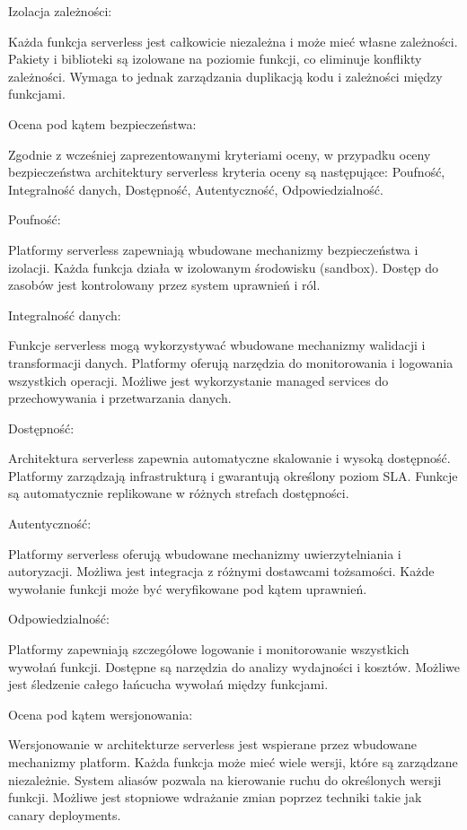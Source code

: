 \documentclass[runningheads,12pt]{llncs}
\begin{document}
Izolacja zależności: 

Każda funkcja serverless jest całkowicie niezależna i może mieć własne zależności. Pakiety i biblioteki są izolowane na poziomie funkcji, co eliminuje konflikty zależności. Wymaga to jednak zarządzania duplikacją kodu i zależności między funkcjami. ~\cite[p. 156]{roberts2018cloud}

Ocena pod kątem bezpieczeństwa:

Zgodnie z wcześniej zaprezentowanymi kryteriami oceny, w przypadku oceny bezpieczeństwa architektury serverless kryteria oceny są następujące: Poufność, Integralność danych, Dostępność, Autentyczność, Odpowiedzialność.

Poufność: 

Platformy serverless zapewniają wbudowane mechanizmy bezpieczeństwa i izolacji. Każda funkcja działa w izolowanym środowisku (sandbox). Dostęp do zasobów jest kontrolowany przez system uprawnień i ról. ~\cite[p. 167]{roberts2018cloud}

Integralność danych: 

Funkcje serverless mogą wykorzystywać wbudowane mechanizmy walidacji i transformacji danych. Platformy oferują narzędzia do monitorowania i logowania wszystkich operacji. Możliwe jest wykorzystanie managed services do przechowywania i przetwarzania danych. ~\cite[p. 189]{roberts2018cloud}

Dostępność: 

Architektura serverless zapewnia automatyczne skalowanie i wysoką dostępność. Platformy zarządzają infrastrukturą i gwarantują określony poziom SLA. Funkcje są automatycznie replikowane w różnych strefach dostępności. ~\cite[p. 198]{roberts2018cloud}

Autentyczność: 

Platformy serverless oferują wbudowane mechanizmy uwierzytelniania i autoryzacji. Możliwa jest integracja z różnymi dostawcami tożsamości. Każde wywołanie funkcji może być weryfikowane pod kątem uprawnień. ~\cite[p. 223]{roberts2018cloud}

Odpowiedzialność: 

Platformy zapewniają szczegółowe logowanie i monitorowanie wszystkich wywołań funkcji. Dostępne są narzędzia do analizy wydajności i kosztów. Możliwe jest śledzenie całego łańcucha wywołań między funkcjami. ~\cite[p. 245]{roberts2018cloud}

Ocena pod kątem wersjonowania:

Wersjonowanie w architekturze serverless jest wspierane przez wbudowane mechanizmy platform. Każda funkcja może mieć wiele wersji, które są zarządzane niezależnie. System aliasów pozwala na kierowanie ruchu do określonych wersji funkcji. Możliwe jest stopniowe wdrażanie zmian poprzez techniki takie jak canary deployments. ~\cite[p. 267]{roberts2018cloud}
\end{document}
